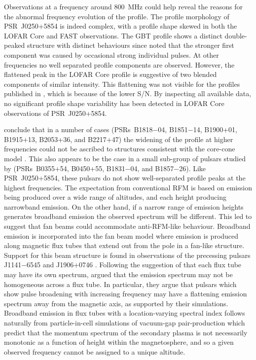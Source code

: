 Observations at a frequency around 800~MHz could help reveal the reasons for the abnormal frequency evolution of the profile. The profile morphology of PSR~J0250+5854 is indeed complex, with a profile shape skewed in both the LOFAR Core and FAST observations. The GBT profile shows a distinct double-peaked structure with distinct behaviours since \citet{TBC+2018} noted that the stronger first component was caused by occasional strong individual pulses. At other frequencies no well separated profile components are observed. However, the flattened peak in the LOFAR Core profile is suggestive of two blended components of similar intensity.  This flattening was not visible for the profiles published in \citet{TBC+2018}, which is because of the lower S/N. By inspecting all available data, no significant profile shape variability has been detected in LOFAR Core observations of PSR~J0250+5854.

\citet{CWxx2014} conclude that in a number of cases (PSRs~B1818$-$04, B1851$-$14, B1900+01, B1915+13, B2053+36, and B2217+47) the widening of the profile at higher frequencies could not be ascribed to structures consistent with the core-cone model \citep[e.g.][]{Rxxx1983a,Rxxx1983b, RRxx1990, Rxxx1993}. This also appears to be the case in a small sub-group of pulsars studied by \citet{PHS+2016} (PSRs~B0355+54, B0450+55, B1831$-$04, and B1857$-$26). Like PSR~J0250+5854, these pulsars do not show well-separated profile peaks at the highest frequencies. The expectation from conventional RFM is based on emission being produced over a wide range of altitudes, and each height producing narrowband emission. On the other hand, if a narrow range of emission heights generates broadband emission the observed spectrum will be different. This led \citet{CWxx2014} to suggest that fan beams could accommodate anti-RFM-like behaviour. Broadband emission is incorporated into the fan beam model \citep{Mxxx1987, DRDx2010, DRxx2012, DRxx2013, WPZ+2014} where emission is produced along magnetic flux tubes that extend out from the pole in a fan-like structure. Support for this beam structure is found in observations of the precessing pulsars J1141$-$6545 and J1906+0746 \citep{MKS+2010, DKC+2013}. Following the suggestion of \citet{Mxxx1987} that each flux tube may have its own spectrum, \citet{CWC+2007} argued that the emission spectrum may not be homogeneous across a flux tube. In particular, they argue that pulsars which show pulse broadening with increasing frequency may have a flattening emission spectrum away from the magnetic axis, as supported by their simulations. Broadband emission in flux tubes with a location-varying spectral index follows naturally from particle-in-cell simulations of vacuum-gap pair-production \citep{Txxx2010} which predict that the momentum spectrum of the secondary plasma is not necessarily monotonic as a function of height within the magnetosphere, and so a given observed frequency cannot be assigned to a unique altitude.


